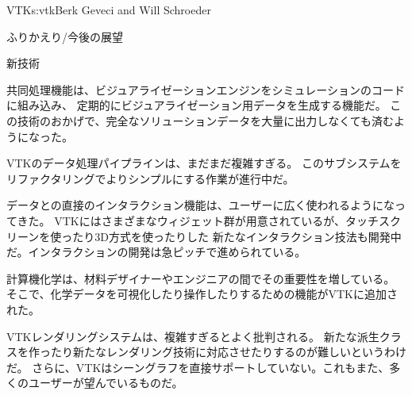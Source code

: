 \begin{aosachapter}{VTK}{s:vtk}{Berk Geveci and Will Schroeder}
\begin{aosasect1}{ふりかえり/今後の展望}
\begin{aosasect2}{新技術}
\begin{aosaitemize}
  \item 共同処理機能は、ビジュアライゼーションエンジンをシミュレーションのコードに組み込み、
  定期的にビジュアライゼーション用データを生成する機能だ。
  この技術のおかげで、完全なソリューションデータを大量に出力しなくても済むようになった。

  \item VTKのデータ処理パイプラインは、まだまだ複雑すぎる。
  このサブシステムをリファクタリングでよりシンプルにする作業が進行中だ。

  \item データとの直接のインタラクション機能は、ユーザーに広く使われるようになってきた。
  VTKにはさまざまなウィジェット群が用意されているが、タッチスクリーンを使ったり3D方式を使ったりした
  新たなインタラクション技法も開発中だ。インタラクションの開発は急ピッチで進められている。

  \item 計算機化学は、材料デザイナーやエンジニアの間でその重要性を増している。
  そこで、化学データを可視化したり操作したりするための機能がVTKに追加された。

  \item VTKレンダリングシステムは、複雑すぎるとよく批判される。
  新たな派生クラスを作ったり新たなレンダリング技術に対応させたりするのが難しいというわけだ。
  さらに、VTKはシーングラフを直接サポートしていない。これもまた、多くのユーザーが望んでいるものだ。


\end{aosaitemize}
\end{aosasect2}
\end{aosasect1}
\end{aosachapter}
